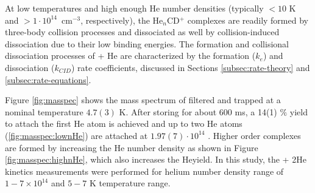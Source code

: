 

At low temperatures and high enough He number densities (typically $< 10$ K and
$> 1\cdot10^{14}$~cm$^{-3}$, respectively), the He$_n$CD$^+$ complexes are
readily formed by three-body collision processes and dissociated as well by
collision-induced dissociation due to their low binding energies. The formation
and collisional dissociation processes of \CD + He are characterized by the
formation ($k_{e}$) and dissociation ($k_{CID}$) rate coefficients, discussed
in Sections \ref{subsec:rate-theory} and \ref{subsec:rate-equations}.

Figure \ref{fig:masspec} shows the mass spectrum of filtered and trapped \CD at
a nominal temperature $4.7(3)$ K. After storing \CD for about 600 ms, a 14(1)
$\%$ yield to attach the first He atom is achieved and up to two He atoms
(\ref{fig:masspec:lownHe}) are attached at $1.97(7) \cdot 10^{14}$ \percc.
Higher order complexes are formed by increasing the He number density as shown
in Figure \ref{fig:masspec:highnHe}, which also increases the He\CD yield. In
this study, the \CD + 2He kinetics measurements were performed for helium
number density range of $1-7 \times 10^{14}$ \percc and $5 - 7$ K temperature
range.